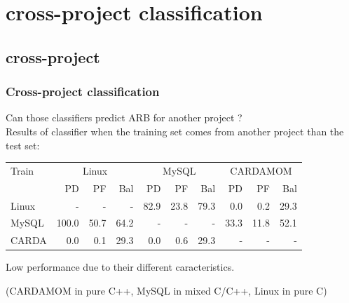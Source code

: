 \documentclass{beamer}
\begin{document}
\section{cross-project classification}
\subsection{cross-project}
\begin{frame}
 \frametitle{Cross-project classification}
 \alert{Can those classifiers predict ARB for another project ?}\\
 Results of classifier when the training set comes from another project than the test set:
 \begin{center}
 \begin{tabular}{l|r r r|r r r|r r r}
  Train & \multicolumn{3}{c}{Linux} & \multicolumn{3}{c}{MySQL} & \multicolumn{3}{c}{CARDAMOM}\\
  ~ & PD & PF & Bal & PD & PF & Bal & PD & PF & Bal\\
  \hline
  Linux & - & - & - & 82.9 & 23.8 & 79.3 & 0.0 & 0.2 & 29.3\\
  MySQL & 100.0 & 50.7 & 64.2 & - & - & - & 33.3 & 11.8 & 52.1\\
  CARDA & 0.0 & 0.1 & 29.3 & 0.0 & 0.6 & 29.3 & - & - & -\\
  \hline
 \end{tabular}
 \end{center}
 Low performance due to their different caracteristics.
 \begin{center}
  (CARDAMOM in pure C++, MySQL in mixed C/C++, Linux in pure C)
 \end{center}
\end{frame}
\end{document}
